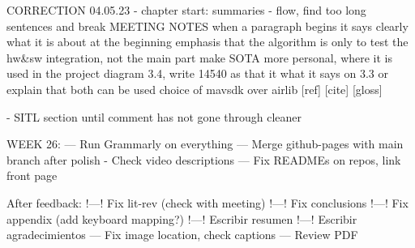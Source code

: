 CORRECTION 04.05.23
 - chapter start: summaries
 - flow, find too long sentences and break
 MEETING NOTES
when a paragraph begins it says clearly what it is about at the beginning
emphasis that the algorithm is only to test the hw&sw integration, not the main part
make SOTA more personal, where it is used in the project
diagram 3.4, write 14540 as that it what it says on 3.3 or explain that both can be used
choice of mavsdk over airlib
[ref] [cite] [gloss]

- SITL section until comment has not gone through cleaner

 
WEEK 26:
    --- Run Grammarly on everything
    --- Merge github-pages with main branch after polish
        - Check video descriptions
    --- Fix READMEs on repos, link front page
        
After feedback:
    !---! Fix lit-rev (check with meeting)
    !---! Fix conclusions
    !---! Fix appendix (add keyboard mapping?)
    !---! Escribir resumen
    !---! Escribir agradecimientos
    --- Fix image location, check captions
    --- Review PDF